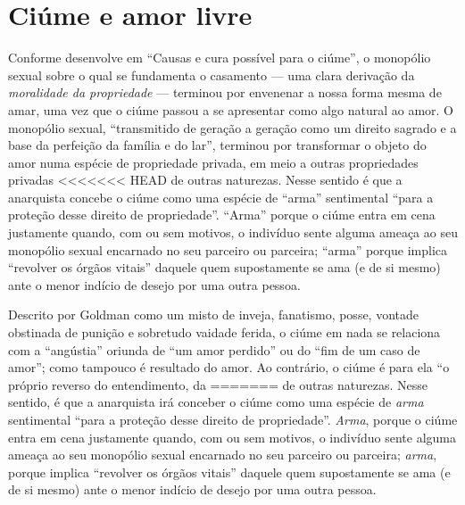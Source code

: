 {\section{Ciúme e amor livre}

Conforme desenvolve em ``Causas e cura possível para o ciúme'', o
monopólio sexual sobre o qual se fundamenta o casamento --- uma clara
derivação da \textit{moralidade da propriedade} --- terminou por envenenar a
nossa forma mesma de amar, uma vez que o ciúme passou a se apresentar
como algo natural ao amor. O monopólio sexual, ``transmitido de
geração a geração como um direito sagrado e a base da perfeição da
família e do lar'', terminou por transformar o objeto do amor numa
espécie de propriedade privada, em meio a outras propriedades privadas
<<<<<<< HEAD
de outras naturezas. Nesse sentido é que a anarquista concebe o
ciúme como uma espécie de ``arma'' sentimental ``para a proteção desse
direito de propriedade''.
``Arma'' porque o ciúme entra em cena
justamente quando, com ou sem motivos, o indivíduo sente alguma ameaça
ao seu monopólio sexual encarnado no seu parceiro ou parceira; ``arma''
porque implica ``revolver os órgãos vitais'' daquele quem supostamente
se ama (e de si mesmo) ante o menor indício de desejo por uma outra
pessoa.

Descrito por Goldman como um misto de inveja, fanatismo, posse,
vontade obstinada de punição e sobretudo vaidade ferida, o ciúme em
nada se relaciona com a ``angústia'' oriunda de ``um amor perdido'' ou
do ``fim de um caso de amor''; como tampouco é resultado do amor. Ao
contrário, o ciúme é para ela ``o próprio reverso do entendimento, da
=======
de outras naturezas. Nesse sentido, é que a anarquista irá conceber o
ciúme como uma espécie de \textit{arma} sentimental ``para a proteção desse
direito de propriedade''. \textit{Arma}, porque o ciúme entra em cena
justamente quando, com ou sem motivos, o indivíduo sente alguma ameaça
ao seu monopólio sexual encarnado no seu parceiro ou parceira; \textit{arma},
porque implica ``revolver os órgãos vitais'' daquele quem supostamente
se ama (e de si mesmo) ante o menor indício de desejo por uma outra
pessoa. 

}
